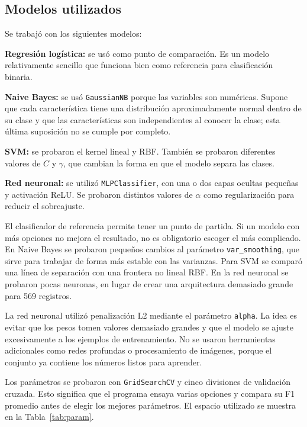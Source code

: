 \documentclass[conference]{IEEEtran}
\begin{document}
\subsection{Modelos utilizados}
Se trabajó con los siguientes modelos:\par
\textbf{Regresión logística:} se usó como punto de comparación. Es un modelo relativamente sencillo que funciona bien como referencia para clasificación binaria.\par
\textbf{Naive Bayes:} se usó \texttt{GaussianNB} porque las variables son numéricas. Supone que cada característica tiene una distribución aproximadamente normal dentro de su clase y que las características son independientes al conocer la clase; esta última suposición no se cumple por completo.\par
\textbf{SVM:} se probaron el kernel lineal y RBF. También se probaron diferentes valores de $C$ y $\gamma$, que cambian la forma en que el modelo separa las clases.\par
\textbf{Red neuronal:} se utilizó \texttt{MLPClassifier}, con una o dos capas ocultas pequeñas y activación ReLU. Se probaron distintos valores de $\alpha$ como regularización para reducir el sobreajuste.


El clasificador de referencia permite tener un punto de partida. Si un modelo con más opciones no mejora el resultado, no es obligatorio escoger el más complicado. En Naive Bayes se probaron pequeños cambios al parámetro \texttt{var\_smoothing}, que sirve para trabajar de forma más estable con las varianzas. Para SVM se comparó una línea de separación con una frontera no lineal RBF. En la red neuronal se probaron pocas neuronas, en lugar de crear una arquitectura demasiado grande para 569 registros.

La red neuronal utilizó penalización L2 mediante el parámetro \texttt{alpha}. La idea es evitar que los pesos tomen valores demasiado grandes y que el modelo se ajuste excesivamente a los ejemplos de entrenamiento. No se usaron herramientas adicionales como redes profundas o procesamiento de imágenes, porque el conjunto ya contiene los números listos para aprender.

Los parámetros se probaron con \texttt{GridSearchCV} y cinco divisiones de validación cruzada. Esto significa que el programa ensaya varias opciones y compara su F1 promedio antes de elegir los mejores parámetros. El espacio utilizado se muestra en la Tabla~\ref{tab:param}.
\end{document}
